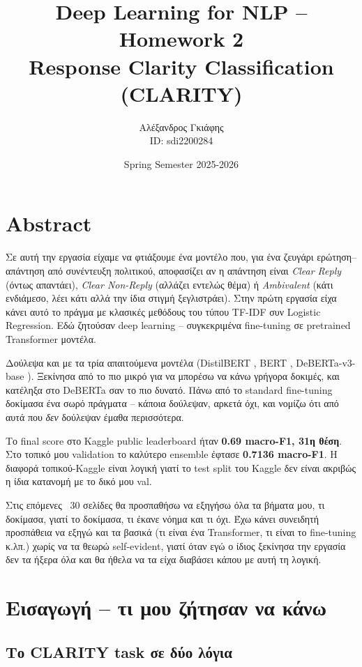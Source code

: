 \documentclass[12pt]{fphw}
\title{Deep Learning for NLP -- Homework 2 \\ Response Clarity Classification (CLARITY)}
\author{Αλέξανδρος Γκιάφης \\ ID: sdi2200284}
\date{Spring Semester 2025-2026}
\institute{National and Kapodistrian University of Athens \\ Department of Informatics and Telecommunications}
\begin{document}
\maketitle

{
  \hypersetup{linkcolor=black}
  \tableofcontents
}
\newpage

\section{Abstract}

Σε αυτή την εργασία είχαμε να φτιάξουμε ένα μοντέλο που, για ένα ζευγάρι ερώτηση--απάντηση από συνέντευξη πολιτικού, αποφασίζει αν η απάντηση είναι \emph{Clear Reply} (όντως απαντάει), \emph{Clear Non-Reply} (αλλάζει εντελώς θέμα) ή \emph{Ambivalent} (κάτι ενδιάμεσο, λέει κάτι αλλά την ίδια στιγμή ξεγλιστράει). Στην πρώτη εργασία είχα κάνει αυτό το πράγμα με κλασικές μεθόδους του τύπου TF-IDF συν Logistic Regression. Εδώ ζητούσαν deep learning -- συγκεκριμένα fine-tuning σε pretrained Transformer μοντέλα.

Δούλεψα και με τα τρία απαιτούμενα μοντέλα (DistilBERT \cite{sanh2019distilbert}, BERT \cite{devlin2019bert}, DeBERTa-v3-base \cite{he2021deberta}). Ξεκίνησα από το πιο μικρό για να μπορέσω να κάνω γρήγορα δοκιμές, και κατέληξα στο DeBERTa σαν το πιο δυνατό. Πάνω από το standard fine-tuning δοκίμασα ένα σωρό πράγματα -- κάποια δούλεψαν, αρκετά όχι, και νομίζω ότι από αυτά που \emph{δεν} δούλεψαν έμαθα περισσότερα.

Το final score στο Kaggle public leaderboard ήταν \textbf{0.69 macro-F1, 31η θέση}. Στο τοπικό μου validation το καλύτερο ensemble έφτασε \textbf{0.7136 macro-F1}. Η διαφορά τοπικού-Kaggle είναι λογική γιατί το test split του Kaggle δεν είναι ακριβώς η ίδια κατανομή με το δικό μου val.

Στις επόμενες ~30 σελίδες θα προσπαθήσω να εξηγήσω όλα τα βήματα μου, τι δοκίμασα, γιατί το δοκίμασα, τι έκανε νόημα και τι όχι. Έχω κάνει συνειδητή προσπάθεια να εξηγώ και τα βασικά (τι είναι ένα Transformer, τι είναι το fine-tuning κ.λπ.) χωρίς να τα θεωρώ self-evident, γιατί όταν εγώ ο ίδιος ξεκίνησα την εργασία δεν τα ήξερα όλα και θα ήθελα να τα είχα διαβάσει κάπου με αυτή τη λογική.

\section{Εισαγωγή -- τι μου ζήτησαν να κάνω}

\subsection{Το CLARITY task σε δύο λόγια}
\end{document}
